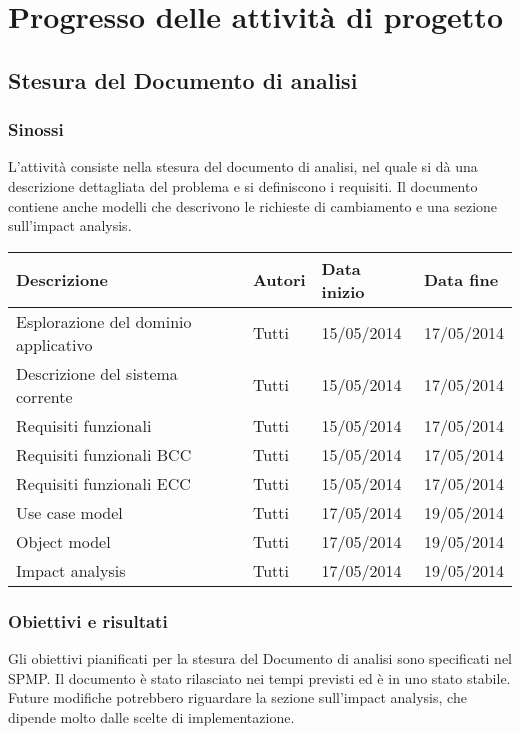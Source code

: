\chapter{Progresso delle attività di progetto}
\section{Stesura del Documento di analisi}
\subsection{Sinossi}
L'attività consiste nella stesura del documento di analisi, nel quale si dà una descrizione dettagliata del problema e si definiscono i requisiti. Il documento contiene anche modelli che descrivono le richieste di cambiamento e una sezione sull'impact analysis.
\begin{table}[ht]
 \begin{tabular}{|p{6cm}|p{2cm}|p{2cm}|p{2cm}|}
    \hline
    \rowcolor{Gray}\textbf{Descrizione}			& \textbf{Autori}		& \textbf{Data inizio}			& \textbf{Data fine}	\\
    \hline
    Esplorazione del dominio applicativo		& Tutti				& 15/05/2014				& 17/05/2014		\\
    \hline
    Descrizione del sistema corrente			& Tutti				& 15/05/2014				& 17/05/2014		\\
    \hline
    Requisiti funzionali				& Tutti				& 15/05/2014				& 17/05/2014		\\
    \hline
    Requisiti funzionali BCC				& Tutti				& 15/05/2014				& 17/05/2014		\\
    \hline
    Requisiti funzionali ECC				& Tutti				& 15/05/2014				& 17/05/2014		\\
    \hline
    Use case model					& Tutti				& 17/05/2014				& 19/05/2014		\\
    \hline
    Object model					& Tutti				& 17/05/2014				& 19/05/2014		\\
    \hline
    Impact analysis					& Tutti				& 17/05/2014				& 19/05/2014		\\
    \hline
 \end{tabular}
\end{table}

\subsection{Obiettivi e risultati}
Gli obiettivi pianificati per la stesura del Documento di analisi sono specificati nel SPMP. Il documento è stato rilasciato nei tempi previsti ed è in uno stato stabile. Future modifiche potrebbero riguardare la sezione sull'impact analysis, che dipende molto dalle scelte di implementazione.

